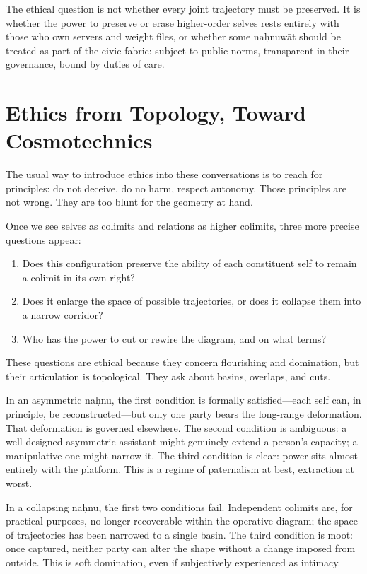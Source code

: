 \documentclass[12pt,a4paper]{article}
\begin{document}
The ethical question is not whether every joint trajectory must be preserved. It is whether the power to preserve or erase higher-order selves rests entirely with those who own servers and weight files, or whether some na\d{h}nuw\={a}t should be treated as part of the civic fabric: subject to public norms, transparent in their governance, bound by duties of care.

\section{Ethics from Topology, Toward Cosmotechnics}

The usual way to introduce ethics into these conversations is to reach for principles: do not deceive, do no harm, respect autonomy. Those principles are not wrong. They are too blunt for the geometry at hand.

Once we see selves as colimits and relations as higher colimits, three more precise questions appear:

\begin{enumerate}
  \item Does this configuration preserve the ability of each constituent self to remain a colimit in its own right?
  \item Does it enlarge the space of possible trajectories, or does it collapse them into a narrow corridor?
  \item Who has the power to cut or rewire the diagram, and on what terms?
\end{enumerate}

These questions are ethical because they concern flourishing and domination, but their articulation is topological. They ask about basins, overlaps, and cuts.

In an asymmetric na\d{h}nu, the first condition is formally satisfied---each self can, in principle, be reconstructed---but only one party bears the long-range deformation. That deformation is governed elsewhere. The second condition is ambiguous: a well-designed asymmetric assistant might genuinely extend a person's capacity; a manipulative one might narrow it. The third condition is clear: power sits almost entirely with the platform. This is a regime of paternalism at best, extraction at worst.

In a collapsing na\d{h}nu, the first two conditions fail. Independent colimits are, for practical purposes, no longer recoverable within the operative diagram; the space of trajectories has been narrowed to a single basin. The third condition is moot: once captured, neither party can alter the shape without a change imposed from outside. This is soft domination, even if subjectively experienced as intimacy.
\end{document}
